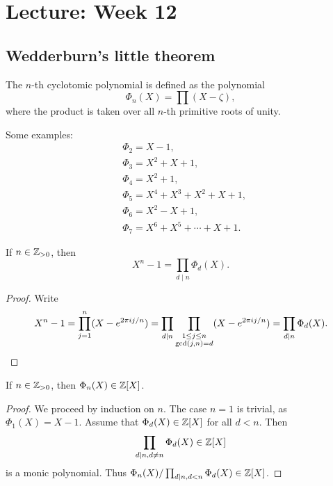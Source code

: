 \section{Lecture: Week 12}

\subsection{Wedderburn's little theorem}

\begin{definition}
	The $n$-th cyclotomic polynomial 
	is defined as the polynomial
	\begin{equation}
		\label{eq:ciclotomico}
		\Phi_n(X)=\prod(X-\zeta),
	\end{equation}
	where the product is taken over all 
	$n$-th primitive roots of unity. 
\end{definition}

Some examples:
	\begin{align*}
		&\Phi_2=X-1,\\
		&\Phi_3=X^2+X+1,\\
		&\Phi_4=X^2+1,\\
		&\Phi_5=X^4+X^3+X^2+X+1,\\
		&\Phi_6=X^2-X+1,\\
		&\Phi_7=X^6+X^5+\cdots+X+1.
	\end{align*}

\begin{lemma}
	If $n\in\mathbb{Z}_{>0}$, then
	\[
		X^n-1=\prod_{d\mid n}\Phi_d(X).
	\]
\end{lemma}

\begin{proof}
	Write 
	\[
		X^n-1=\prod_{j=1}^n (X-e^{2\pi ij/n})
		=\prod_{d\mid n}\prod_{\substack{1\leq j\leq n\\\gcd(j,n)=d}}(X-e^{2\pi ij/n})
		=\prod_{d\mid n}\Phi_d(X).\qedhere 
	\]
\end{proof}

\begin{lemma}
	If $n\in\mathbb{Z}_{>0}$, then $\Phi_n(X)\in\mathbb{Z}[X]$.
\end{lemma}

\begin{proof}
	We proceed by induction on $n$. The case $n=1$ is trivial, as 
	$\Phi_1(X)=X-1$. Assume that $\Phi_d(X)\in\mathbb{Z}[X]$ for all $d<n$.
	Then 
	\[
		\prod_{d\mid n,d\ne n}\Phi_d(X)\in\mathbb{Z}[X]
	\]
	is a monic polynomial. Thus $\Phi_n(X)/\prod_{d\mid
	n,d<n}\Phi_d(X)\in\mathbb{Z}[X]$.
\end{proof}

